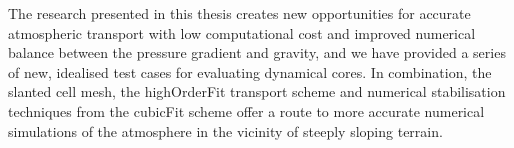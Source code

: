The research presented in this thesis creates new opportunities for accurate atmospheric transport with low computational cost and improved numerical balance between the pressure gradient and gravity, and we have provided a series of new, idealised test cases for evaluating dynamical cores.
In combination, the slanted cell mesh, the highOrderFit transport scheme and numerical stabilisation techniques from the cubicFit scheme offer a route to more accurate numerical simulations of the atmosphere in the vicinity of steeply sloping terrain.
